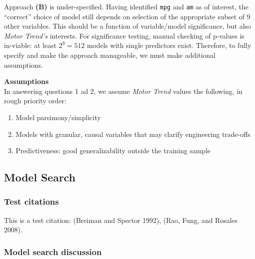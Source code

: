 \documentclass[]{article}
\providecommand{\tightlist}{%
  \setlength{\itemsep}{0pt}\setlength{\parskip}{0pt}}
\begin{document}
Approach \textbf{(B)} is under-specified. Having identified \texttt{mpg}
and \texttt{am} as of interest, the ``correct'' choice of model still
depends on selection of the appropriate subset of 9 other variables.
This should be a function of variable/model significance, but also
\emph{Motor Trend's} interests. For significance testing, manual
checking of p-values is in-viable: at least \(2^{9} = 512\) models with
single predictors exist. Therefore, to fully specify and make the
approach manageable, we must make additional assumptions.

\textbf{Assumptions}\\
In answering questions 1 ad 2, we assume \emph{Motor Trend} values the
following, in rough priority order:

\begin{enumerate}
\def\labelenumi{(\alph{enumi})}
\tightlist
\item
  Model parsimony/simplicity
\item
  Models with granular, causal variables that may clarify engineering
  trade-offs
\item
  Predictiveness: good generalizability outside the training sample
\end{enumerate}

\subsection{Model Search}\label{model-search}

\subsubsection{Test citations}\label{test-citations}

This is a test citation: (Breiman and Spector 1992), (Rao, Fung, and
Rosales 2008).

\subsubsection{Model search discussion}\label{model-search-discussion}
\end{document}
